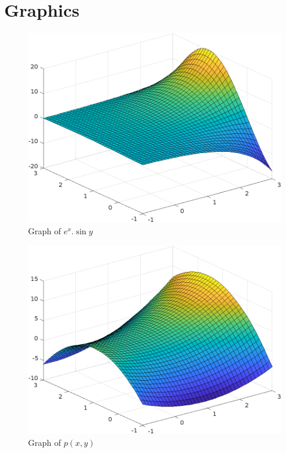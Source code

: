 \documentclass[a4paper, oneside]{article}
\begin{document}
\section{Graphics}
\begin{figure}[h!]
    \centering
    \includegraphics[width=\textwidth-9em]{resources/exsiny.png}
    \caption{Graph of $e^x.\sin y$}
    \label{fig:exsiny}
\end{figure}
\begin{figure}[h!]
    \centering
    \includegraphics[width=\textwidth-9em]{resources/approx-exsiny.png}
    \caption{Graph of $p(x,y)$}
    \label{fig:approx-exsiny}
\end{figure}
\end{document}
